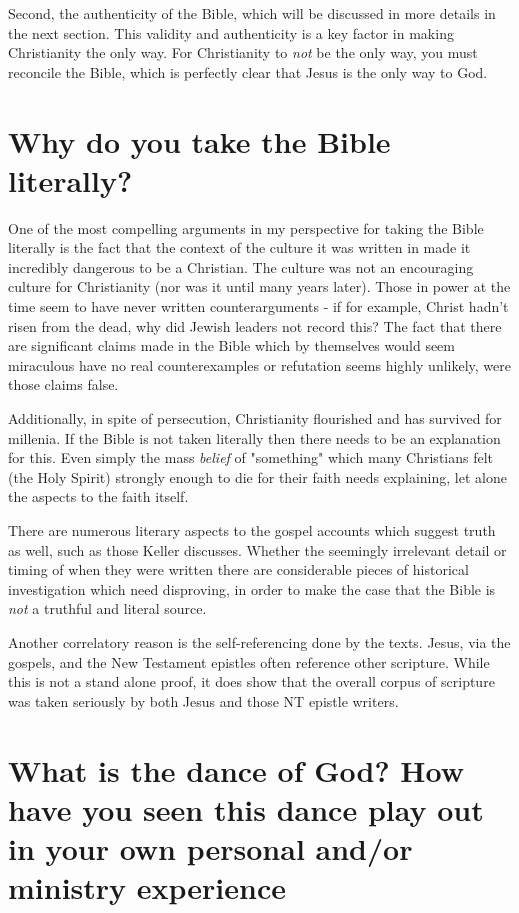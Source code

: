 \documentclass[12pt]{turabian-researchpaper}
\begin{document}
Second, the authenticity of the Bible, which will be discussed in more details in the next section. This validity and authenticity is a key factor in making Christianity the only way. For Christianity to \textit{not} be the only way, you must reconcile the Bible, which is perfectly clear that Jesus is the only way to God. 

\section{Why do you take the Bible literally?}

One of the most compelling arguments in my perspective for taking the Bible literally is the fact that the context of the culture it was written in made it incredibly dangerous to be a Christian. The culture was not an encouraging culture for Christianity (nor was it  until many years later). Those in power at the time seem to have never written counterarguments - if for example, Christ hadn't risen from the dead, why did Jewish leaders not record this? The fact that there are significant claims made in the Bible which by themselves would seem miraculous have no real counterexamples or refutation seems highly unlikely, were those claims false.

Additionally, in spite of persecution, Christianity flourished and has survived for millenia. If the Bible is not taken literally then there needs to be an explanation for this. Even simply the mass \textit{belief} of "something" which many Christians felt (the Holy Spirit) strongly enough to die for their faith needs explaining, let alone the aspects to the faith itself.

There are numerous literary aspects to the gospel accounts which suggest truth as well, such as those Keller discusses. Whether the seemingly irrelevant detail\autocite[pg.110-111]{keller2008reason} or timing of when they were written\autocite[pg.104]{keller2008reason} there are considerable pieces of historical investigation which need disproving, in order to make the case that the Bible is \textit{not} a truthful and literal source.

Another correlatory reason is the self-referencing done by the texts. Jesus, via the gospels, and the New Testament epistles often reference other scripture. While this is not a stand alone proof, it does show that the overall corpus of scripture was taken seriously by both Jesus and those NT epistle writers.

\section{What is the dance of God? How have you seen this dance play out in your own personal and/or ministry experience}
\end{document}
